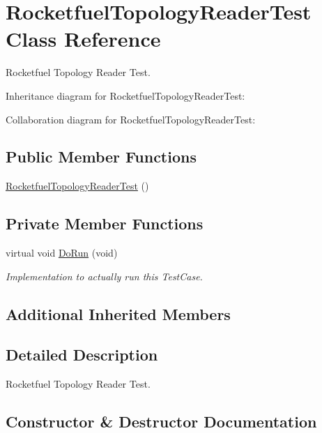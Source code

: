 \hypertarget{classRocketfuelTopologyReaderTest}{}\section{Rocketfuel\+Topology\+Reader\+Test Class Reference}
\label{classRocketfuelTopologyReaderTest}


Rocketfuel Topology Reader Test.  




Inheritance diagram for Rocketfuel\+Topology\+Reader\+Test\+:


Collaboration diagram for Rocketfuel\+Topology\+Reader\+Test\+:
\subsection*{Public Member Functions}
\begin{DoxyCompactItemize}
\item 
\hyperlink{classRocketfuelTopologyReaderTest_ad8ee206b87e8b295685b819ee1d651ea}{Rocketfuel\+Topology\+Reader\+Test} ()
\end{DoxyCompactItemize}
\subsection*{Private Member Functions}
\begin{DoxyCompactItemize}
\item 
virtual void \hyperlink{classRocketfuelTopologyReaderTest_a5e947257785045c8f59f6f1ee382a6a1}{Do\+Run} (void)
\begin{DoxyCompactList}\small\item\em Implementation to actually run this Test\+Case. \end{DoxyCompactList}\end{DoxyCompactItemize}
\subsection*{Additional Inherited Members}


\subsection{Detailed Description}
Rocketfuel Topology Reader Test. 

\subsection{Constructor \& Destructor Documentation}
